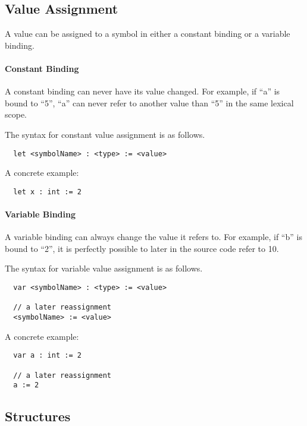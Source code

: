 \subsection{Value Assignment}
\label{sec:value_assignment}

A value can be assigned to a symbol in either a constant binding or a variable binding. 

\paragraph{Constant Binding}

A constant binding can never have its value changed. For example, if \enquote{a} is bound to \enquote{5}, \enquote{a} can never refer to another value than \enquote{5} in the same lexical scope.

The syntax for constant value assignment is as follows.
\begin{verbatim}
  let <symbolName> : <type> := <value>
\end{verbatim}

A concrete example:

\begin{verbatim}
  let x : int := 2
\end{verbatim}

\paragraph{Variable Binding}

A variable binding can always change the value it refers to. For example, if \enquote{b} is bound to \enquote{2}, it is perfectly possible to later in the source code refer to {10}.

The syntax for variable value assignment is as follows.
\begin{verbatim}
  var <symbolName> : <type> := <value>

  // a later reassignment
  <symbolName> := <value>
\end{verbatim}

A concrete example:

\begin{verbatim}
  var a : int := 2
  
  // a later reassignment
  a := 2
\end{verbatim}

\subsection{Structures}
\label{sec:structs}


